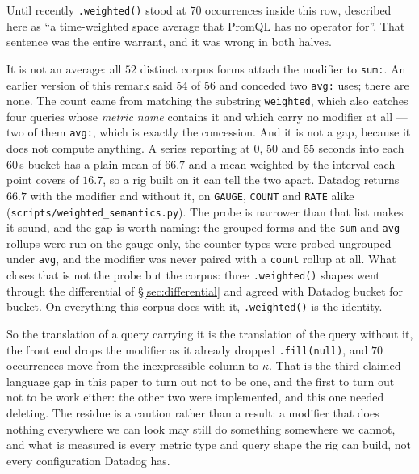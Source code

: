\begin{remark}%
\label{rem:weighted}
Until recently \texttt{.weighted()} stood at $70$ occurrences inside this row, described
here as ``a time-weighted space average that PromQL has no operator for''. That sentence
was the entire warrant, and it was wrong in both halves.

It is not an average: all $52$ distinct corpus forms attach the modifier to
\texttt{sum:}. An earlier version of this remark said $54$ of $56$ and conceded two
\texttt{avg:} uses; there are none. The count came from matching the substring
\texttt{weighted}, which also catches four queries whose \emph{metric name} contains it
and which carry no modifier at all --- two of them \texttt{avg:}, which is exactly the
concession. And it is not a gap, because it does not compute anything. A series
reporting at $0$, $50$ and $55$ seconds into each $60$\,s bucket has a plain mean of
$66.7$ and a mean weighted by the interval each point covers of $16.7$, so a rig built
on it can tell the two apart. Datadog returns $66.7$ with the modifier and without it,
on \texttt{GAUGE}, \texttt{COUNT} and \texttt{RATE} alike
(\texttt{scripts\slash weighted\_semantics.py}). The probe is narrower than that list
makes it sound, and the gap is worth naming: the grouped forms and the \texttt{sum} and
\texttt{avg} rollups were run on the gauge only, the counter types were probed
ungrouped under \texttt{avg}, and the modifier was never paired with a \texttt{count}
rollup at all. What closes that is not the probe but the corpus: three
\texttt{.weighted()} shapes went through the differential of \S\ref{sec:differential}
and agreed with Datadog bucket for bucket. On everything this corpus does with it,
\texttt{.weighted()} is the identity.

So the translation of a query carrying it is the translation of the query without it,
the front end drops the modifier as it already dropped \texttt{.fill(null)}, and $70$
occurrences move from the inexpressible column to $\kappa$. That is the third claimed
language gap in this paper to turn out not to be one, and the first to turn out not to
be work either: the other two were implemented, and this one needed deleting. The residue is a caution rather than a result: a modifier that does nothing
everywhere we can look may still do something somewhere we cannot, and what is measured
is every metric type and query shape the rig can build, not every configuration Datadog
has.
\end{remark}
